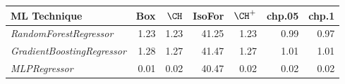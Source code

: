 \begin{table}[ht]
\centering
\begin{tabular}{lrrrrrr}
  \hline
ML Technique & {\sc Box} & $\CH$ & {\sc IsoFor} & $\CH^+$ & chp.05 & chp.1 \\ 
  \hline
{\em RandomForestRegressor} & 1.23 & 1.23 & 41.25 & 1.23 & 0.99 & 0.97 \\ 
  {\em GradientBoostingRegressor} & 1.28 & 1.27 & 41.47 & 1.27 & 1.01 & 1.01 \\ 
  {\em MLPRegressor} & 0.01 & 0.02 & 40.47 & 0.02 & 0.02 & 0.02 \\ 
   \hline
\end{tabular}
\end{table}
